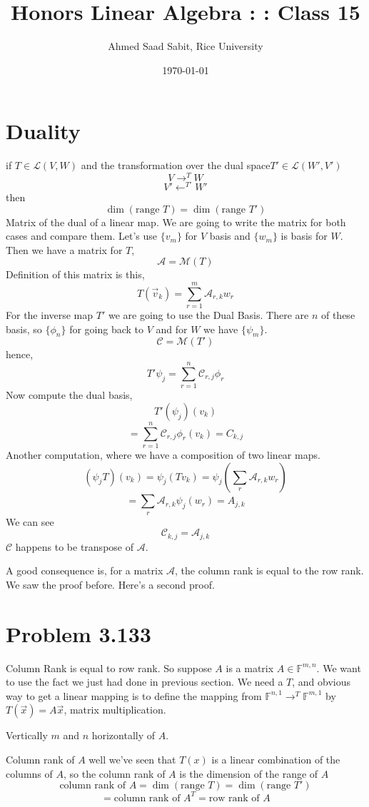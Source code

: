 \documentclass[letter]{article}
\title{Honors Linear Algebra : : Class 15}
\author{Ahmed Saad Sabit, Rice University}
\date{\today}
\begin{document}
\maketitle

\section*{Duality} 
if $T \in  \mathcal L (V,W)$ and the transformation over the dual space$T' \in \mathcal L (W',V')$
\[
V \to ^{T} W
\]
\[
V' \leftarrow ^{T'} W'
\] 
then 
\[
\dim \left(\text{range } T\right) = 
\dim \left(\text{range } T'\right)
\]
Matrix of the dual of a linear map. We are going to write the matrix for both cases and compare them. 
Let's use $\{v_m\} $ for $V$ basis and $\{w_m\} $ is basis for $W$. Then we have a matrix for $T$, 
\[
\mathcal A =  \mathcal M (T)
\] 
Definition of this matrix is this, 
\[
	T(\vec{v}_k) = \sum_{r=1}^{m} \mathcal A_{r,k} w_r
\] 
For the inverse map $T'$ we are going to use the Dual Basis. There are $n$ of these basis, so $\{\phi_n\} $ for going back to $V$ and for $W$ we have $\{\psi_m\} $. $$\mathcal C = \mathcal M (T')$$ hence,
\[
T' \psi_j = 
\sum_{r=1}^{n} \mathcal C_{r,j} \phi_r
\]
Now compute the dual basis, 
\[
T' (\psi_j) \left(v_k\right)
\] 
\[
	=	\sum_{r=1}^{n} \mathcal C_{r,j} \phi_r(v_k) = C_{k,j}
\]
Another computation, where we have a composition of two linear maps. 
\[
	(\psi_j T )(v_k) = \psi_j (T v_k ) = \psi_j \left(\sum_{r}^{} \mathcal A_{r,k} w_r\right)
\]
\[
	= \sum_{r}^{} \mathcal A_{r,k} \psi_j (w_r) = A_{j,k}
\] 
We can see 
\[
	\mathcal C _{k,j} = \mathcal A _{j,k}
\]
$\mathcal C$ happens to be transpose of $\mathcal A$.

A good consequence is, for a matrix $\mathcal A$, the column rank is equal to the row rank. We saw the proof before. Here's a second proof. 

\section*{Problem 3.133} 
Column Rank is equal to row rank. So suppose $A$ is a matrix $A \in \mathbb{F}^{m,n}$. We want to use the fact we just had done in previous section. We need a $T$, and obvious way to get a linear mapping is to define the mapping from $\mathbb{F}^{n,1} \to ^{T} \mathbb{F}^{m,1}$ by $T(\vec{x}) = A \vec{x}$, matrix multiplication. 

Vertically $m$ and $n$ horizontally of $A$. 

Column rank of $A$ well we've seen that $T(x)$ is a linear combination of the columns of $A$, so the column rank of $A$ is the dimension of the range of $A$ 
\[
\text{column rank of }A = \dim \left(\text{range } T\right) = 
\dim \left(\text{range } T' \right)
\]
\[
= \text{column rank of }A^{T} =
 \text{row rank of }A
\]
\end{document}
